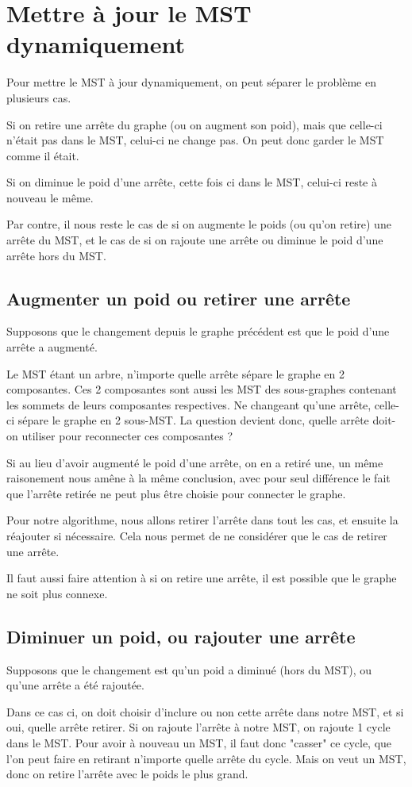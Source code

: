 \section{Mettre à jour le MST dynamiquement}

Pour mettre le MST à jour dynamiquement, on peut séparer le problème en plusieurs cas.

Si on retire une arrête du graphe (ou on augment son poid), mais que celle-ci n'était pas dans le MST, celui-ci ne change pas.
On peut donc garder le MST comme il était.

Si on diminue le poid d'une arrête, cette fois ci dans le MST, celui-ci reste à nouveau le même.

Par contre, il nous reste le cas de si on augmente le poids (ou qu'on retire) une arrête du MST, et le cas de si on rajoute une arrête ou diminue le poid d'une arrête hors du MST.

\subsection{Augmenter un poid ou retirer une arrête}

Supposons que le changement depuis le graphe précédent est que le poid d'une arrête a augmenté.

Le MST étant un arbre, n'importe quelle arrête sépare le graphe en 2 composantes.
Ces 2 composantes sont aussi les MST des sous-graphes contenant les sommets de leurs composantes respectives.
Ne changeant qu'une arrête, celle-ci sépare le graphe en 2 sous-MST.
La question devient donc, quelle arrête doit-on utiliser pour reconnecter ces composantes ?

Si au lieu d'avoir augmenté le poid d'une arrête, on en a retiré une, un même raisonement nous amêne à la même conclusion, avec pour seul différence le fait que l'arrête retirée ne peut plus être choisie pour connecter le graphe.

Pour notre algorithme, nous allons retirer l'arrête dans tout les cas, et ensuite la réajouter si nécessaire.
Cela nous permet de ne considérer que le cas de retirer une arrête.

Il faut aussi faire attention à si on retire une arrête, il est possible que le graphe ne soit plus connexe.

\subsection{Diminuer un poid, ou rajouter une arrête}

Supposons que le changement est qu'un poid a diminué (hors du MST), ou qu'une arrête a été rajoutée.

Dans ce cas ci, on doit choisir d'inclure ou non cette arrête dans notre MST, et si oui, quelle arrête retirer.
Si on rajoute l'arrête à notre MST, on rajoute 1 cycle dans le MST.
Pour avoir à nouveau un MST, il faut donc "casser" ce cycle, que l'on peut faire en retirant n'importe quelle arrête du cycle.
Mais on veut un MST, donc on retire l'arrête avec le poids le plus grand.
